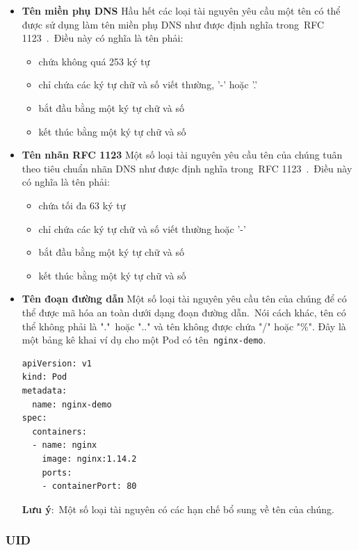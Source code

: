 \documentclass[12pt,a4paper]{report}
\begin{document}
	\begin{itemize}
		\item \textbf{Tên miền phụ DNS}
		\subitem Hầu hết các loại tài nguyên yêu cầu một tên có thể được sử dụng làm tên miền phụ DNS như được định nghĩa trong RFC 1123 . Điều này có nghĩa là tên phải:
		\begin{itemize}
			\item chứa không quá 253 ký tự
			\item chỉ chứa các ký tự chữ và số viết thường, '-' hoặc '.'
			\item bắt đầu bằng một ký tự chữ và số
			\item kết thúc bằng một ký tự chữ và số
		\end{itemize}
	
		\item \textbf{Tên nhãn RFC 1123}
		\subitem Một số loại tài nguyên yêu cầu tên của chúng tuân theo tiêu chuẩn nhãn DNS như được định nghĩa trong RFC 1123 . Điều này có nghĩa là tên phải:
		\begin{itemize}
			\item chứa tối đa 63 ký tự
			\item chỉ chứa các ký tự chữ và số viết thường hoặc '-'
			\item bắt đầu bằng một ký tự chữ và số
			\item kết thúc bằng một ký tự chữ và số
		\end{itemize}
	
		\item \textbf{Tên đoạn đường dẫn}
		\subitem Một số loại tài nguyên yêu cầu tên của chúng để có thể được mã hóa an toàn dưới dạng đoạn đường dẫn. Nói cách khác, tên có thể không phải là "." hoặc ".." và tên không được chứa "/" hoặc "\%".
		\subitem Đây là một bảng kê khai ví dụ cho một Pod có tên \texttt{nginx-demo}.
		\smallskip
\begin{lstlisting}[language=Bash]
apiVersion: v1
kind: Pod
metadata:
  name: nginx-demo
spec:
  containers:
  - name: nginx
    image: nginx:1.14.2
    ports:
    - containerPort: 80
\end{lstlisting}
	\smallskip
	\subitem \textbf{Lưu ý}: Một số loại tài nguyên có các hạn chế bổ sung về tên của chúng.
	\end{itemize}
	
	\subsubsection{UID}
	\smallskip
	\hspace{1cm}{Một chuỗi do hệ thống Kubernetes tạo để xác định duy nhất các đối tượng.\\}
	
\end{document}

